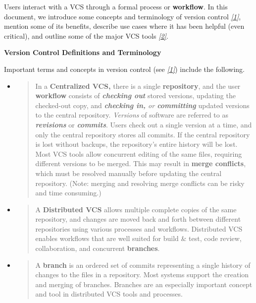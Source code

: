 \documentclass[]{article}
\begin{document}
Users interact with a VCS through a formal process or \textbf{workflow}.
In this document, we introduce some concepts and terminology of version
control \protect\hyperlink{h.zeieakqm2nff}{\emph{{[}1{]}}}, mention some
of its benefits, describe use cases where it has been helpful (even
critical), and outline some of the major VCS tools
\protect\hyperlink{h.f53m6pxt4rgc}{\emph{{[}2{]}}}.

\textbf{Version Control Definitions and Terminology}

Important terms and concepts in version control (see
\protect\hyperlink{h.zeieakqm2nff}{\emph{{[}1{]}}}) include the
following.

\begin{itemize}
\item
  \begin{quote}
  In a \textbf{Centralized VCS,} there is a single \textbf{repository},
  and the user \textbf{workflow} consists of \emph{\textbf{checking
  out}} stored versions, updating the checked-out copy, and
  \emph{\textbf{checking in,} or \textbf{committing}} updated versions
  to the central repository. \emph{Versions} of software are referred to
  as \emph{\textbf{revisions}} or \emph{\textbf{commits}}. Users check
  out a single version at a time, and only the central repository stores
  all commits. If the central repository is lost without backups, the
  repository's entire history will be lost. Most VCS tools allow
  concurrent editing of the same files, requiring different versions to
  be merged. This may result in \textbf{merge conflicts}, which must be
  resolved manually before updating the central repository. (Note:
  merging and resolving merge conflicts can be risky and time
  consuming.)
  \end{quote}
\item
  \begin{quote}
  A \textbf{Distributed VCS} allows multiple complete copies of the same
  repository, and changes are moved back and forth between different
  repositories using various processes and workflows. Distributed VCS
  enables workflows that are well suited for build \& test, code review,
  collaboration, and concurrent \textbf{branches}.
  \end{quote}
\item
  \begin{quote}
  A \textbf{branch} is an ordered set of commits representing a single
  history of changes to the files in a repository. Most systems support
  the creation and merging of branches. Branches are an especially
  important concept and tool in distributed VCS tools and processes.
  \end{quote}
\end{itemize}
\end{document}

